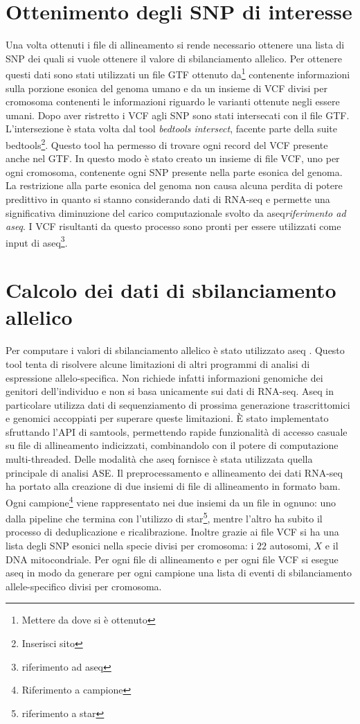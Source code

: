   \section{Ottenimento degli SNP di interesse}
  Una volta ottenuti i file di allineamento si rende necessario ottenere una lista di SNP dei quali si vuole ottenere il valore di sbilanciamento allelico.
  Per ottenere questi dati sono stati utilizzati un file GTF ottenuto da\footnote{Mettere da dove si \`e ottenuto} contenente informazioni sulla porzione esonica del genoma umano e da un insieme di VCF divisi per cromosoma contenenti le informazioni riguardo le varianti ottenute negli essere umani.
  Dopo aver ristretto i VCF agli SNP sono stati intersecati con il file GTF.
  L'intersezione \`e stata volta dal tool \emph{bedtools intersect}, facente parte della suite bedtools\footnote{Inserisci sito}.
  Questo tool ha permesso di trovare ogni record del VCF presente anche nel GTF.
  In questo modo \`e stato creato un insieme di file VCF, uno per ogni cromosoma, contenente ogni SNP presente nella parte esonica del genoma.
  La restrizione alla parte esonica del genoma non causa alcuna perdita di potere predittivo in quanto si stanno considerando dati di RNA-seq e permette una significativa diminuzione del carico computazionale svolto da aseq\emph{riferimento ad aseq}.
  I VCF risultanti da questo processo sono pronti per essere utilizzati come input di aseq\footnote{riferimento ad aseq}.

  \section{Calcolo dei dati di sbilanciamento allelico}
  \label{sec:aseq}
  Per computare i valori di sbilanciamento allelico \`e stato utilizzato aseq \cite{aseq}.
  Questo tool tenta di risolvere alcune limitazioni di altri programmi di analisi di espressione allelo-specifica.
  Non richiede infatti informazioni genomiche dei genitori dell'individuo e non si basa unicamente sui dati di RNA-seq.
  Aseq in particolare utilizza dati di sequenziamento di prossima generazione trascrittomici e genomici accoppiati per superare queste limitazioni.
  \`E stato implementato sfruttando l'API di samtools, permettendo rapide funzionalit\`a di accesso casuale su file di allineamento indicizzati, combinandolo con il potere di computazione multi-threaded.
  Delle modalit\`a che aseq fornisce \`e stata utilizzata quella principale di analisi ASE.
  Il preprocessamento e allineamento dei dati RNA-seq ha portato alla creazione di due insiemi di file di allineamento in formato bam.
  Ogni campione\footnote{Riferimento a campione} viene rappresentato nei due insiemi da un file in ognuno: uno dalla pipeline che termina con l'utilizzo di star\footnote{riferimento a star}, mentre l'altro ha subito il processo di deduplicazione e ricalibrazione.
  Inoltre grazie ai file VCF si ha una lista degli SNP esonici nella specie divisi per cromosoma: i $22$ autosomi, $X$ e il DNA mitocondriale.
  Per ogni file di allineamento e per ogni file VCF si esegue aseq in modo da generare per ogni campione una lista di eventi di sbilanciamento allele-specifico divisi per cromosoma.

  
